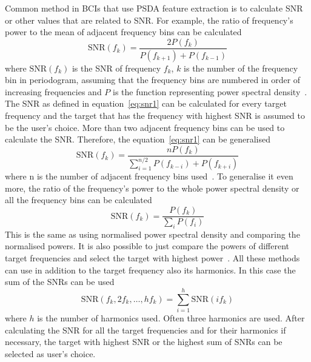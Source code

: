 Common method in \glspl{BCI} that use \gls{PSDA} \gls{feature extraction} is to calculate \gls{SNR} or other values that are related to \gls{SNR}. For example, the ratio of frequency's power to the mean of adjacent frequency bins can be calculated
\begin{equation}
	\label{eq:snr1}
	\mbox{SNR}(f_k) = \frac{2P(f_k)}{P(f_{k+1})+P(f_{k-1})}
\end{equation}
where $\mbox{SNR}(f_k)$ is the \gls{SNR} of frequency $f_k$, $k$ is the number of the \gls{frequency bin} in \gls{periodogram}, assuming that the \glspl{frequency bin} are numbered in order of increasing frequencies and $P$ is the function representing \gls{power spectral density}~\cite{psda_snr1}. The \gls{SNR} as defined in equation~\ref{eq:snr1} can be calculated for every \gls{target} frequency and the \gls{target} that has the frequency with highest \gls{SNR} is assumed to be the user's choice. More than two adjacent frequency bins can be used to calculate the \gls{SNR}. Therefore, the equation~\ref{eq:snr1} can be generalised
\begin{equation}
	\mbox{SNR}(f_k) = \frac{nP(f_k)}{\sum_{i=1}^{n/2}P(f_{k-i})+P(f_{k+i})}
\end{equation}
where n is the number of adjacent frequency bins used~\cite{psda_snr2}. To generalise it even more, the ratio of the frequency's power to the whole \gls{power spectral density} or all the \glspl{frequency bin} can be calculated
\begin{equation}
	\mbox{SNR}(f_k) = \frac{P(f_k)}{\sum_i P(f_i)}
\end{equation}
This is the same as using normalised \gls{power spectral density} and comparing the normalised powers. It is also possible to just compare the powers of different \gls{target} frequencies and select the \gls{target} with highest power~\cite{cca_psda}. All these methods can use in addition to the \gls{target} frequency also its \glspl{harmonic}. In this case the sum of the \glspl{SNR} can be used
\begin{equation}
	\mbox{SNR}(f_k, 2f_k, \dots, hf_k)=\sum_{i=1}^{h}\mbox{SNR}(if_k)
\end{equation}
where $h$ is the number of \glspl{harmonic} used. Often three \glspl{harmonic} are used. After calculating the \gls{SNR} for all the \gls{target} frequencies and for their \glspl{harmonic} if necessary, the \gls{target} with highest \gls{SNR} or the highest sum of \glspl{SNR} can be selected as user's choice.


